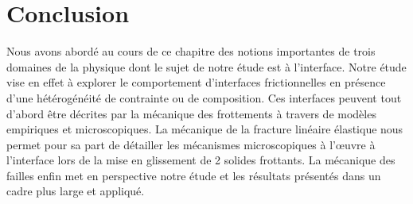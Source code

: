 \newpage

\minitoc
\newpage




\newpage








\section{Conclusion}

Nous avons abordé au cours de ce chapitre des notions importantes de trois domaines de la physique dont le sujet de notre étude est à l'interface. Notre étude vise en effet à explorer le comportement d'interfaces frictionnelles en présence d'une hétérogénéité de contrainte ou de composition. Ces interfaces peuvent tout d'abord être décrites par la mécanique des frottements à travers de modèles empiriques et microscopiques. La mécanique de la fracture linéaire élastique nous permet pour sa part de détailler les mécanismes microscopiques à l'œuvre à l'interface lors de la mise en glissement de 2 solides frottants. La mécanique des failles enfin met en perspective notre étude et les résultats présentés dans un cadre plus large et appliqué.












